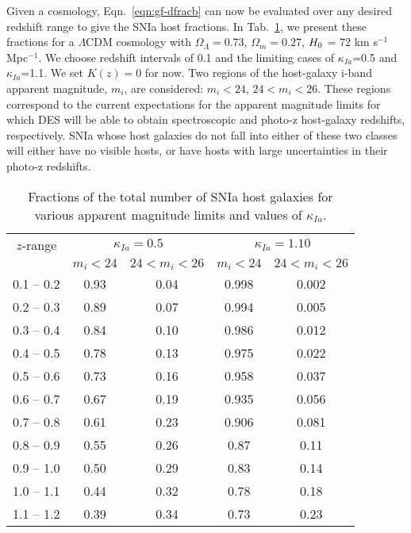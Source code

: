 \documentclass[preprint2]{aastex}    %
\begin{document}
Given a cosmology, Eqn.~\ref{eqn:gf-dfracb} can now be evaluated over any desired redshift range to give the 
SNIa host fractions.  
In Tab.~\ref{tab:galfraction}, we present these fractions for a $\Lambda$CDM cosmology with $\Omega_\Lambda=0.73$, 
$\Omega_m=0.27$, $H_{\rm 0}$ = 72 km s$^{-1}$ Mpc$^{-1}$. We choose redshift intervals of
0.1 and the limiting cases of $\kappa_{Ia}$=0.5 and $\kappa_{Ia}$=1.1. We set $K(z)=0$ for now.  
Two regions of the host-galaxy i-band apparent magnitude,
$m_i$, are considered:  $m_i<24$, $24<m_i<26$. These regions
correspond to the current expectations for the apparent magnitude limits for which DES will be 
able to obtain spectroscopic and photo-z host-galaxy redshifts, respectively. 
SNIa whose host galaxies do not fall into either of these two classes will either have no visible hosts, or have
hosts with large uncertainties in their photo-z redshifts.
 
\begin{table}[h]
\centering%
\begin{tabular}
[c]{|c||c|c||c|c|}\hline
$z$-range & \multicolumn{2}{c||}{$\kappa_{Ia}=0.5$}  & \multicolumn{2}{c|}{$\kappa_{Ia}=1.10$} \\ \cline{2-5}
          & $m_i<24$ & $24<m_i<26$ & $m_i<24$ & $24<m_i<26$  \\
\hline
0.1 -- 0.2 & 0.93 & 0.04 & 0.998 & 0.002   \\
0.2 -- 0.3 & 0.89 & 0.07 & 0.994 & 0.005   \\
0.3 -- 0.4 & 0.84 & 0.10 & 0.986 & 0.012  \\
0.4 -- 0.5 & 0.78 & 0.13 & 0.975 & 0.022  \\
0.5 -- 0.6 & 0.73 & 0.16 & 0.958 & 0.037  \\
0.6 -- 0.7 & 0.67 & 0.19 & 0.935 & 0.056   \\
0.7 -- 0.8 & 0.61 & 0.23 & 0.906 & 0.081   \\
0.8 -- 0.9 & 0.55 & 0.26 & 0.87 & 0.11   \\
0.9 -- 1.0 & 0.50 & 0.29 & 0.83 & 0.14   \\
1.0 -- 1.1 & 0.44 & 0.32 & 0.78 & 0.18   \\
1.1 -- 1.2 & 0.39 & 0.34 & 0.73 & 0.23  \\

\hline
\end{tabular}
\caption{Fractions of the total number of SNIa host galaxies for various apparent magnitude limits and values of $\kappa_{Ia}$.}
\label{tab:galfraction}%
\end{table}
\end{document}
